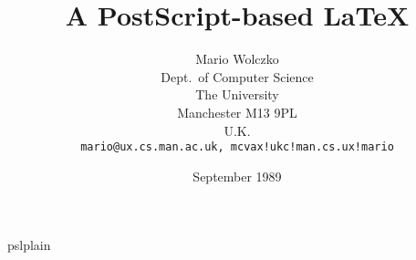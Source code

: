 
\title{A PostScript-based \LaTeX}

\author{Mario Wolczko\\
Dept.~of Computer Science\\
The University\\
Manchester M13 9PL\\
U.K.\\
{\tt mario@ux.cs.man.ac.uk, mcvax!ukc!man.cs.ux!mario}}

\date{September 1989}

\newcommand{\cs}[1]{{\tt \string#1}}
\newcommand{\pslatex}{{\rm PS-\LaTeX}}
\newcommand{\ps}{PostScript}
\def\psfmtname{pslplain}

\ifx\fmtname\psfmtname
  \def\psonly{}
\else 
  \let\psonly\cs
\fi
{}


\maketitle

